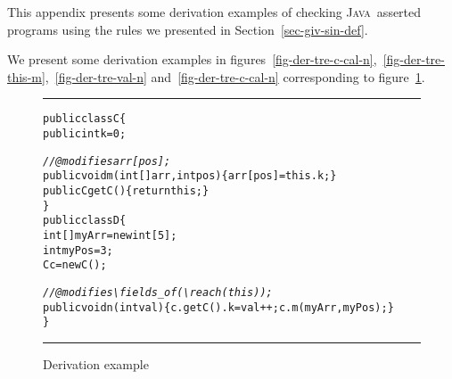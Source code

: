 \documentclass[a4paper]{llncs}
\newcommand{\java}{\textsc{Java}}
\begin{document}
This appendix presents some derivation examples of checking
\java~asserted programs using the rules we presented in
Section~\ref{sec-giv-sin-def}.



We present some derivation examples in
figures~\ref{fig-der-tre-c-cal-n},~\ref{fig-der-tre-this-m},~\ref{fig-der-tre-val-n}
and~\ref{fig-der-tre-c-cal-n} corresponding to
figure~\ref{fig-der-exa}.
\begin{figure}[tbh]
\rule{\linewidth}{0.25mm}
\rule{0em}{0.1ex}
\begin{alltt}
  public class C\verb!{!
    public int k = 0;

    {\it //@modifies arr[pos];}
    public void m(int[] arr, int pos)\verb!{! arr[pos] = this.k; \verb!}!
    public C getC()\verb!{! return this; \verb!}!
  \verb!}!
  public class D\verb!{!
    int[] myArr = new int[5];
    int myPos = 3;
    C c = new C();

    {\it //@modifies \verb!\!fields_of(\verb!\!reach(this));}
    public void n(int val)\verb!{! c.getC().k = val++; c.m(myArr, myPos); \verb!}!
  \verb!}!
\end{alltt}
\caption{Derivation example}
\label{fig-der-exa}
\rule{\linewidth}{0.25mm}
\end{figure} %
\end{document}
